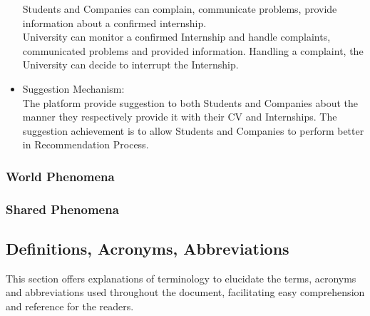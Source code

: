 \begin{itemize}
    Students and Companies can complain, communicate problems, provide information about a confirmed internship.\\
    University can monitor a confirmed Internship and handle complaints, communicated problems and provided information.
    Handling a complaint, the University can decide to interrupt the Internship.
\item {\color{titleColor}Suggestion Mechanism:}\\
    The platform provide suggestion to both Students and Companies about the manner they respectively provide it with their CV and Internships. The suggestion achievement is to allow Students and Companies to perform better in Recommendation Process.
\end{itemize}

\subsubsection{World Phenomena}
\subsubsection{Shared Phenomena}
\subsection{Definitions, Acronyms, Abbreviations}  
This section offers explanations of terminology to elucidate the terms, acronyms and abbreviations used throughout the document, facilitating easy comprehension and reference for the readers.
